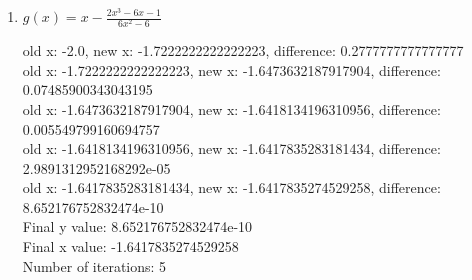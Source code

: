 \documentclass[12pt]{article}
\begin{document}
\begin{enumerate}
\begin{footnotesize}
\begin{spacing}{-.8}
old x: -1.0, new x: -0.5, difference: 0.5\\
old x: -0.5, new x: -0.20833333333333334, difference: 0.29166666666666663\\
old x: -0.20833333333333334, new x: -0.16968074845679013, difference: 0.03865258487654322\\
old x: -0.16968074845679013, new x: -0.1682951242795515, difference: 0.0013856241772386146\\
old x: -0.1682951242795515, new x: -0.16825555489542218, difference: 3.9569384129328755e-05\\
old x: -0.16825555489542218, new x: -0.16825443442539353, difference: 1.120470028648235e-06\\
old x: -0.16825443442539353, new x: -0.1682544027051747, difference: 3.1720218840458614e-08\\
old x: -0.1682544027051747, new x: -0.16825440180718962, difference: 8.979850751877905e-10\\
Final y value: 8.979850751877905e-10\\
Final x value: -0.16825440180718962\\
Number of iterations: 8\\
\end{spacing}
\end{footnotesize}
\vspace{.25in}

Notice that this function can only find the root at $-0.16825440180718962$, even though our intial guess were near the other two roots.  This implies that the function we built for FPI only can capture the root for which the function is going from positive to negative.  Near this root, though, the function is very stable, since it found the root within 8 iterations.

\item $g(x) = x-\frac{2x^3-6x-1}{6x^2-6}$

\begin{footnotesize}
\begin{spacing}{-.8}
old x: -2.0, new x: -1.7222222222222223, difference: 0.2777777777777777\\
old x: -1.7222222222222223, new x: -1.6473632187917904, difference: 0.07485900343043195\\
old x: -1.6473632187917904, new x: -1.6418134196310956, difference: 0.005549799160694757\\
old x: -1.6418134196310956, new x: -1.6417835283181434, difference: 2.9891312952168292e-05\\
old x: -1.6417835283181434, new x: -1.6417835274529258, difference: 8.652176752832474e-10\\
Final y value: 8.652176752832474e-10\\
Final x value: -1.6417835274529258\\
Number of iterations: 5\\
\end{spacing}
\end{footnotesize}
\vspace{.4in}


\end{enumerate}
\end{document}
